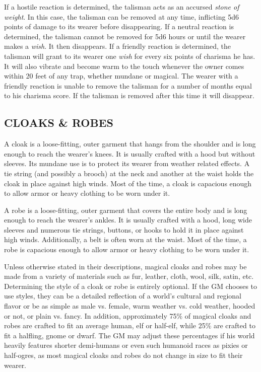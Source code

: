 \begin{multicols}{2}
If a hostile reaction is determined, the talisman acts as an accursed \textit{stone of weight}.  In this case, the talisman can be removed at any time, inflicting 5d6 points of damage to its wearer before disappearing.  If a neutral reaction is determined, the talisman cannot be removed for 5d6 hours or until the wearer makes a \textit{wish}.  It then disappears.  If a friendly reaction is determined, the talisman will grant to its wearer one \textit{wish} for every six points of charisma he has.  It will also vibrate and become warm to the touch whenever the owner comes within 20 feet of any trap, whether mundane or magical.  The wearer with a friendly reaction is unable to remove the talisman for a number of months equal to his charisma score.  If the talisman is removed after this time it will disappear.

\subsection{CLOAKS \& ROBES}

A cloak is a loose-fitting, outer garment that hangs from the shoulder and is long enough to reach the wearer's knees.  It is usually crafted with a hood but without sleeves.  Its mundane use is to protect its wearer from weather related effects.  A tie string (and possibly a brooch) at the neck and another at the waist holds the cloak in place against high winds.  Most of the time, a cloak is capacious enough to allow armor or heavy clothing to be worn under it.

A robe is a loose-fitting, outer garment that covers the entire body and is long enough to reach the wearer's ankles.  It is usually crafted with a hood, long wide sleeves and numerous tie strings, buttons, or hooks to hold it in place against high winds.  Additionally, a belt is often worn at the waist.  Most of the time, a robe is capacious enough to allow armor or heavy clothing to be worn under it.

Unless otherwise stated in their descriptions, magical cloaks and robes may be made from a variety of materials such as fur, leather, cloth, wool, silk, satin, etc.  Determining the style of a cloak or robe is entirely optional.  If the GM chooses to use styles, they can be a detailed reflection of a world's cultural and regional flavor or be as simple as male vs. female, warm weather vs. cold weather, hooded or not, or plain vs. fancy.  In addition, approximately 75\% of magical cloaks and robes are crafted to fit an average human, elf or half-elf, while 25\% are crafted to fit a halfling, gnome or dwarf.  The GM may adjust these percentages if his world heavily features shorter demi-humans or even such humanoid races as pixies or half-ogres, as most magical cloaks and robes do not change in size to fit their wearer.


\end{multicols}
